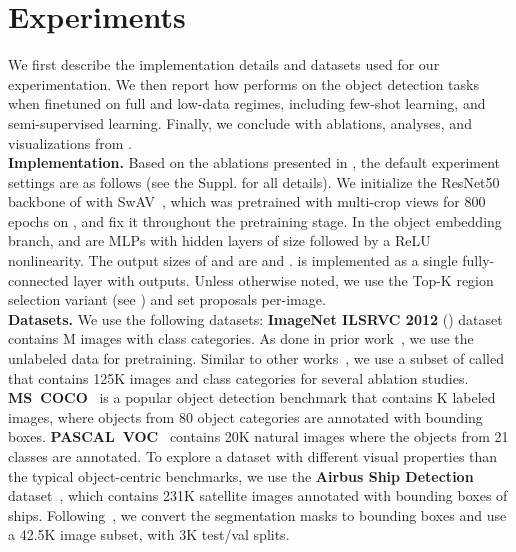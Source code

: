 \section{Experiments}
We first describe the implementation details and datasets used for our experimentation. We then report how \model performs on the object detection tasks when finetuned on full and low-data regimes, including few-shot learning, and semi-supervised learning. Finally, we conclude with ablations, analyses, and visualizations from \model.
\vspace{0.1cm}
\\
\noindent\textbf{Implementation.} Based on the ablations presented in , the default experiment settings are as follows (see the Suppl. for all details). We initialize the ResNet50 backbone of \model with SwAV~\cite{caron2020unsupervised}, which was pretrained with multi-crop views for 800 epochs on \imagenetthousand, and fix it throughout the pretraining stage. In the object embedding branch,  and  are MLPs with  hidden layers of size  followed by a ReLU~\cite{nair2010rectified} nonlinearity. The output sizes of  and  are  and .  is implemented as a single fully-connected layer with  outputs. Unless otherwise noted, we use the \model Top-K region selection variant (see ) and set  proposals per-image.
\vspace{0.1cm}
\\
\noindent\textbf{Datasets.} We use the following datasets: \textbf{ImageNet ILSRVC 2012} (\imagenetthousand) dataset contains M images with  class categories. As done in prior work~\cite{chen2020simple, xiao2021region, caron2020unsupervised, xie2021detco}, we use the unlabeled \imagenetthousand data for pretraining. Similar to other works~\cite{xiao2021region, he2019momentum,he2020momentum}, we use a subset of \imagenetthousand called \textbf{\imagenethundred} that contains 125K images and  class categories for several ablation studies.
\textbf{MS~COCO}~\cite{lin2014microsoft} is a popular object detection benchmark that contains K labeled images, where objects from 80 object categories are annotated with bounding boxes. 
\textbf{PASCAL~VOC}~\cite{everingham2010pascal} contains 20K natural images where the objects from 21 classes are annotated. 
To explore a dataset with different visual properties than the typical object-centric benchmarks, we use the \textbf{Airbus Ship Detection} dataset~\cite{airbus}, which contains 231K satellite images annotated with bounding boxes of ships. Following~\cite{nie2020attention}, we convert the segmentation masks to bounding boxes and use a 42.5K image subset, with 3K test/val splits.

